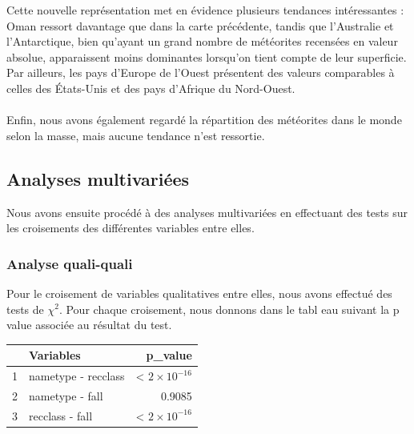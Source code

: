 \documentclass[12pt]{article}
\begin{document}
Cette nouvelle représentation met en évidence plusieurs tendances intéressantes : Oman ressort davantage que dans la carte précédente, tandis que l’Australie et l’Antarctique, bien qu’ayant un grand nombre de météorites recensées en valeur absolue, apparaissent moins dominantes lorsqu’on tient compte de leur superficie. Par ailleurs, les pays d’Europe de l’Ouest présentent des valeurs comparables à celles des États-Unis et des pays d’Afrique du Nord-Ouest.\\
\\
Enfin, nous avons également regardé la répartition des météorites dans le monde selon la masse, mais aucune tendance n'est ressortie.

\subsection{Analyses multivariées}
Nous avons ensuite procédé à des analyses multivariées en effectuant des tests sur les croisements des différentes variables entre elles.
\subsubsection*{Analyse quali-quali}
Pour le croisement de variables qualitatives entre elles, nous avons effectué des tests de $\chi^2$. Pour chaque croisement, nous donnons dans le tabl eau suivant la p value associée au résultat du test.
\begin{table}[H]
\centering
\begin{tabular}{rlr}
  \hline
 & Variables & p\_value \\ 
  \hline
1 & nametype - recclass & < $2\times 10^{-16}$  \\ 
  2 & nametype - fall & 0.9085 \\ 
  3 & recclass - fall & < $2\times 10^{-16}$  \\ 
   \hline
\end{tabular}
\end{table}
\end{document}

